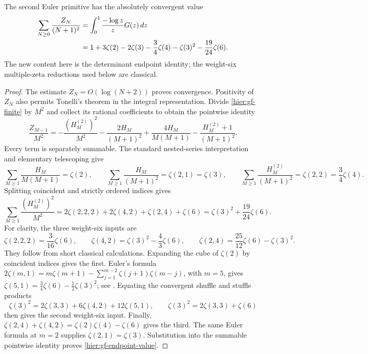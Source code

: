 \begin{corollary}
\label{hier:gf-endpoint}
The second Euler primitive has the absolutely convergent value
\begin{align}\label{hier:gf-endpoint-value}
 \sum_{N\ge0}\frac{Z_N}{(N+1)^2}
 &=\int_0^1\frac{-\log z}{z}G(z)\,dz\notag\\
 &=1+3\zeta(2)-2\zeta(3)-\frac34\zeta(4)
                     -\zeta(3)^2-\frac{19}{24}\zeta(6).
\end{align}
The new content here is the determinant endpoint identity; the
weight-six multiple-zeta reductions used below are classical.
\end{corollary}
\begin{proof}
The estimate $Z_N=O(\log(N+2))$ proves convergence.  Positivity of
$Z_N$ also permits Tonelli's theorem in the integral representation.
Divide \eqref{hier:gf-finite} by $M^2$ and collect its rational
coefficients to obtain the pointwise identity
\[
 \frac{Z_{M-1}}{M^2}
 =-\frac{(H_M^{(2)})^2}{M^2}
  -\frac{2H_M}{(M+1)^2}
  +\frac{4H_M}{M(M+1)}
  -\frac{H_M^{(2)}+1}{(M+1)^2}.
\]
Every term is separately summable.  The standard nested-series
interpretation and elementary telescoping give
\[
 \sum_{M\ge1}\frac{H_M}{M(M+1)}=\zeta(2),\qquad
 \sum_{M\ge1}\frac{H_M}{(M+1)^2}=\zeta(2,1)=\zeta(3),
 \qquad
 \sum_{M\ge1}\frac{H_M^{(2)}}{(M+1)^2}=\zeta(2,2)=\frac34\zeta(4).
\]
Splitting coincident and strictly ordered indices gives
\begin{equation}\label{hier:gf-square-Euler}
 \sum_{M\ge1}\frac{(H_M^{(2)})^2}{M^2}
 =2\zeta(2,2,2)+2\zeta(4,2)+\zeta(2,4)+\zeta(6)
 =\zeta(3)^2+\frac{19}{24}\zeta(6).
\end{equation}
For clarity, the three weight-six inputs are
\[
 \zeta(2,2,2)=\frac3{16}\zeta(6),\qquad
 \zeta(4,2)=\zeta(3)^2-\frac43\zeta(6),\qquad
 \zeta(2,4)=\frac{25}{12}\zeta(6)-\zeta(3)^2.
\]
They follow from short classical calculations.  Expanding the cube
of $\zeta(2)$ by coincident indices gives the first.  Euler's formula
$2\zeta(m,1)=m\zeta(m+1)-\sum_{j=1}^{m-2}
\zeta(j+1)\zeta(m-j)$, with $m=5$, gives
$\zeta(5,1)=\tfrac34\zeta(6)-\tfrac12\zeta(3)^2$;
see \cite[Eq.~(1.3)]{hier:BB2005}.  Equating the convergent shuffle
and stuffle products
\[
 \zeta(3)^2=2\zeta(3,3)+6\zeta(4,2)+12\zeta(5,1),
 \qquad
 \zeta(3)^2=2\zeta(3,3)+\zeta(6)
\]
then gives the second weight-six input.  Finally,
$\zeta(2,4)+\zeta(4,2)=\zeta(2)\zeta(4)-\zeta(6)$ gives the third.
The same Euler formula at $m=2$ supplies $\zeta(2,1)=\zeta(3)$.
Substitution into the summable pointwise identity proves
\eqref{hier:gf-endpoint-value}.
\end{proof}
